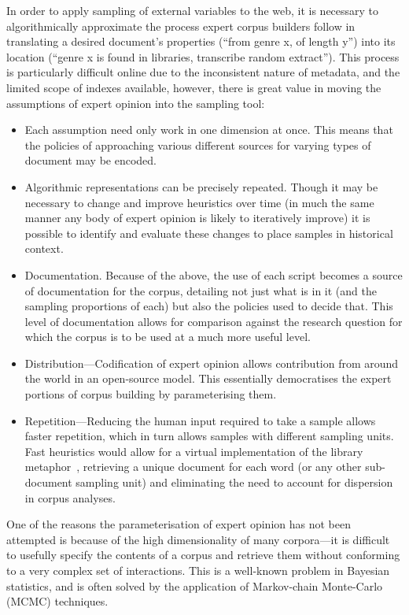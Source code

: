 In order to apply sampling of external variables to the web, it is necessary to algorithmically approximate the process expert corpus builders follow in translating a desired document's properties (``from genre x, of length y'') into its location (``genre x is found in libraries, transcribe random extract'').  This process is particularly difficult online due to the inconsistent nature of metadata, and the limited scope of indexes available, however, there is great value in moving the assumptions of expert opinion into the sampling tool:

\begin{itemize}
    \item Each assumption need only work in one dimension at once.  This means that the policies of approaching various different sources for varying types of document may be encoded.
    \item Algorithmic representations can be precisely repeated.  Though it may be necessary to change and improve heuristics over time (in much the same manner any body of expert opinion is likely to iteratively improve) it is possible to identify and evaluate these changes to place samples in historical context.
    \item Documentation.  Because of the above, the use of each script becomes a source of documentation for the corpus, detailing not just what is in it (and the sampling proportions of each) but also the policies used to decide that.  This level of documentation allows for comparison against the research question for which the corpus is to be used at a much more useful level.
    \item Distribution---Codification of expert opinion allows contribution from around the world in an open-source model.  This essentially democratises the expert portions of corpus building by parameterising them.
    \item Repetition---Reducing the human input required to take a sample allows faster repetition, which in turn allows samples with different sampling units.  Fast heuristics would allow for a virtual implementation of the library metaphor~\cite{evert2006random}, retrieving a unique document for each word (or any other sub-document sampling unit) and eliminating the need to account for dispersion in corpus analyses.
\end{itemize}


One of the reasons the parameterisation of expert opinion has not been attempted is because of the high dimensionality of many corpora---it is difficult to usefully specify the contents of a corpus and retrieve them without conforming to a very complex set of interactions.  This is a well-known problem in Bayesian statistics, and is often solved by the application of Markov-chain Monte-Carlo (MCMC) techniques.

